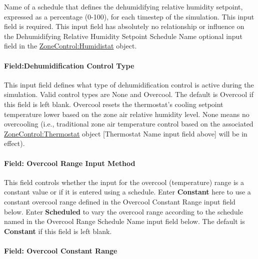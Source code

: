 Name of a schedule that defines the dehumidifying relative humidity setpoint, expressed as a percentage (0-100), for each timestep of the simulation. This input field is required. This input field has absolutely no relationship or influence on the Dehumidifying Relative Humidity Setpoint Schedule Name optional input field in the \hyperref[zonecontrolhumidistat]{ZoneControl:Humidistat} object.

\paragraph{Field:Dehumidification Control Type}\label{fielddehumidification-control-type}

This input field defines what type of dehumidification control is active during the simulation. Valid control types are None and Overcool. The default is Overcool if this field is left blank. Overcool resets the thermostat's cooling setpoint temperature lower based on the zone air relative humidity level. None means no overcooling (i.e., traditional zone air temperature control based on the associated \hyperref[zonecontrolthermostat]{ZoneControl:Thermostat} object {[}Thermostat Name input field above{]} will be in effect).

\paragraph{Field: Overcool Range Input Method}\label{field-overcool-range-input-method}

This field controls whether the input for the overcool (temperature) range is a constant value or if it is entered using a schedule. Enter \textbf{Constant} here to use a constant overcool range defined in the Overcool Constant Range input field below. Enter \textbf{Scheduled} to vary the overcool range according to the schedule named in the Overcool Range Schedule Name input field below. The default is \textbf{Constant} if this field is left blank.

\paragraph{Field: Overcool Constant Range}\label{field-overcool-constant-range}

